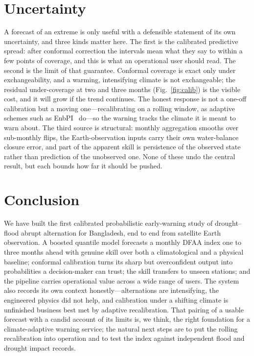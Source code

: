 \documentclass[conference]{IEEEtran}
\begin{document}
\section{Uncertainty}
A forecast of an extreme is only useful with a defensible statement of its own uncertainty, and three
kinds matter here. The first is the calibrated predictive spread: after conformal correction the
intervals mean what they say to within a few points of coverage, and this is what an operational user
should read. The second is the limit of that guarantee. Conformal coverage is exact only under
exchangeability, and a warming, intensifying climate is not exchangeable; the residual under-coverage at
two and three months (Fig.~\ref{fig:calib}) is the visible cost, and it will grow if the trend
continues. The honest response is not a one-off calibration but a moving one---recalibrating on a rolling
window, as adaptive schemes such as EnbPI~\cite{xuxie2021} do---so the warning tracks the climate it is
meant to warn about. The third source is structural: monthly aggregation smooths over sub-monthly flips,
the Earth-observation inputs carry their own water-balance closure error, and part of the apparent skill
is persistence of the observed state rather than prediction of the unobserved one. None of these undo the
central result, but each bounds how far it should be pushed.

\section{Conclusion}
We have built the first calibrated probabilistic early-warning study of drought--flood abrupt alternation
for Bangladesh, end to end from satellite Earth observation. A boosted quantile model forecasts a monthly
DFAA index one to three months ahead with genuine skill over both a climatological and a physical
baseline; conformal calibration turns its sharp but overconfident output into probabilities a
decision-maker can trust; the skill transfers to unseen stations; and the pipeline carries operational
value across a wide range of users. The system also records its own context honestly---alternations are
intensifying, the engineered physics did not help, and calibration under a shifting climate is unfinished
business best met by adaptive recalibration. That pairing of a usable forecast with a candid account of
its limits is, we think, the right foundation for a climate-adaptive warning service; the natural next
steps are to put the rolling recalibration into operation and to test the index against independent flood
and drought impact records.
\end{document}
